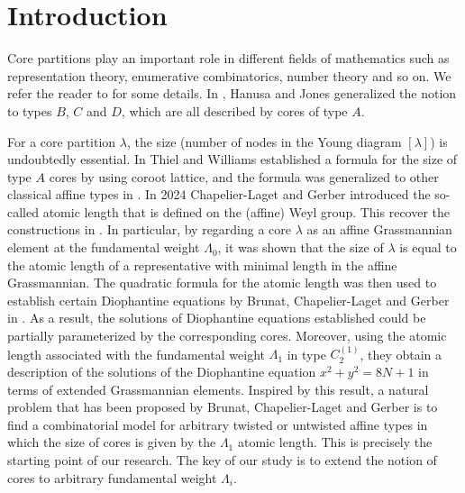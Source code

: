 \documentclass[11pt]{amsart}
\theoremstyle{plain}
\numberwithin{equation}{subsection}
\newcommand{\lam}{\lambda}
\begin{document}

\tableofcontents


\section{Introduction}

Core partitions play an important role in different fields of mathematics
such as representation theory, enumerative combinatorics, number theory and so on.
We refer the reader to \cite{A, BDF, BCG, F2, GKS, GO, JL} for some details. In \cite{HJ2}, Hanusa and Jones generalized
the notion to types $B$, $C$ and $D$, which are all described by cores of type $A$.

For a core partition $\lam$, the size (number of nodes in the Young diagram $[\lam]$) is undoubtedly essential. 
In \cite{TW} Thiel and Williams established a formula for the size of 
type $A$ cores by using coroot lattice, and the formula was generalized to other classical affine types in \cite{STW}.
In 2024 Chapelier-Laget and Gerber introduced the so-called atomic length that is defined on the (affine) Weyl
group. This recover the constructions in \cite{TW,STW}. In particular, by regarding a core $\lam$ as an affine Grassmannian element 
at the fundamental weight $\Lambda_0$, it was shown that the size of $\lam$
is equal to the atomic length of a representative with minimal length in the affine Grassmannian. 
The quadratic formula for the atomic length was then used to establish certain Diophantine equations 
by Brunat, Chapelier-Laget and Gerber in \cite{BCG}. As a result, the solutions of Diophantine equations 
established could be partially parameterized by the corresponding cores. 
Moreover, using the atomic length associated with the fundamental weight $\Lambda_1$
in type $C_2^{(1)}$, they obtain a description of the solutions of the Diophantine equation
$x^2+y^2= 8N+1$ in terms of extended Grassmannian elements. Inspired by this result, a natural problem that has been proposed
by Brunat, Chapelier-Laget and Gerber is to find a combinatorial model for arbitrary twisted or untwisted affine types in which the size of cores
is given by the $\Lambda_1$ atomic length. This is precisely the starting point of our research.
The key of our study is to extend the notion of cores to arbitrary fundamental weight $\Lambda_i$.
\end{document}
